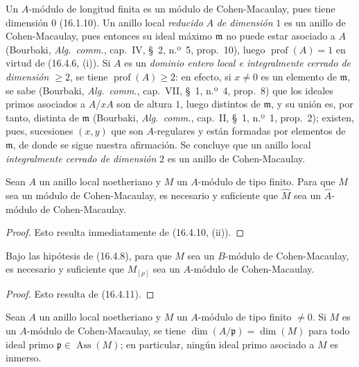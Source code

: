Un $A$-módulo de longitud finita es un módulo de Cohen-Macaulay, pues tiene
dimensión $0$ (16.1.10). Un anillo local \emph{reducido} $A$ \emph{de dimensión} $1$ es un
anillo de Cohen-Macaulay, pues entonces su ideal máximo $\mathfrak{m}$ no puede
estar asociado a $A$ (Bourbaki, \emph{Alg.~comm.}, cap.~IV, \S~2, n.º~5,
prop.~10), luego $\operatorname{prof}(A)=1$ en virtud de (16.4.6, (i)). Si $A$
es un \emph{dominio entero local e integralmente cerrado de dimensión
$\geq2$}, se tiene $\operatorname{prof}(A)\geq2$: en efecto, si $x\neq0$ es un
elemento de $\mathfrak{m}$, se sabe (Bourbaki, \emph{Alg.~comm.}, cap.~VII,
\S~1, n.º~4, prop.~8) que los ideales primos asociados a $A/xA$ son de altura
$1$, luego distintos de $\mathfrak{m}$, y su unión es, por tanto, distinta de
$\mathfrak{m}$ (Bourbaki, \emph{Alg.~comm.}, cap.~II, \S~1, n.º~1,
prop.~2); existen, pues, sucesiones $(x,y)$ que son $A$-regulares y están
formadas por elementos de $\mathfrak{m}$, de donde se sigue nuestra afirmación.
Se concluye que un anillo local \emph{integralmente cerrado de dimensión} $2$ es un
anillo de Cohen-Macaulay.

\begin{proposition}[16.5.2]
\label{0.16.5.2-es}
Sean $A$ un anillo local noetheriano y $M$ un $A$-módulo de tipo finito. Para
que $M$ sea un módulo de Cohen-Macaulay, es necesario y suficiente que
$\widehat M$ sea un $\widehat A$-módulo de Cohen-Macaulay.
\end{proposition}
\begin{proof}
Esto resulta inmediatamente de (16.4.10, (ii)).
\end{proof}

\begin{proposition}[16.5.3]
\label{0.16.5.3-es}
Bajo las hipótesis de \textup{(16.4.8)}, para que $M$ sea un $B$-módulo de
Cohen-Macaulay, es necesario y suficiente que $M_{[\rho]}$ sea un $A$-módulo de
Cohen-Macaulay.
\end{proposition}

\begin{proof}
Esto resulta de (16.4.11).
\end{proof}

\begin{proposition}[16.5.4]
\label{0.16.5.4-es}
Sean $A$ un anillo local noetheriano y $M$ un $A$-módulo de tipo finito $\neq0$.
Si $M$ es un $A$-módulo de Cohen-Macaulay, se tiene
$\dim(A/\mathfrak{p})=\dim(M)$ para todo ideal primo
$\mathfrak{p}\in\operatorname{Ass}(M)$; en particular, ningún ideal primo
asociado a $M$ es inmerso.
\end{proposition}

